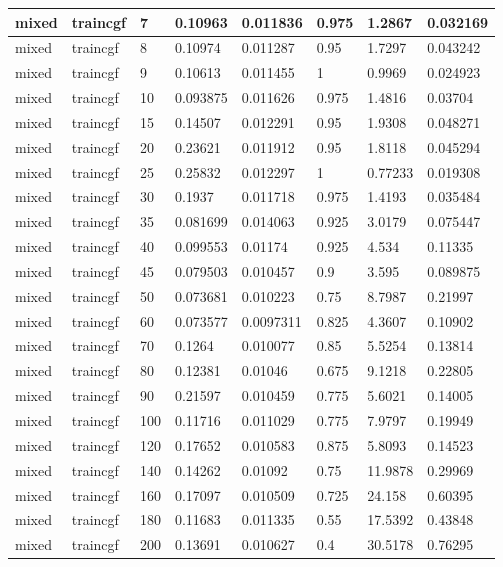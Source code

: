 \begin{longtable}{llllllll}
mixed & traincgf & 7 & 0.10963 & 0.011836 & 0.975 & 1.2867 & 0.032169 \\ \hline 
mixed & traincgf & 8 & 0.10974 & 0.011287 & 0.95 & 1.7297 & 0.043242 \\ \hline 
mixed & traincgf & 9 & 0.10613 & 0.011455 & 1 & 0.9969 & 0.024923 \\ \hline 
mixed & traincgf & 10 & 0.093875 & 0.011626 & 0.975 & 1.4816 & 0.03704 \\ \hline 
mixed & traincgf & 15 & 0.14507 & 0.012291 & 0.95 & 1.9308 & 0.048271 \\ \hline 
mixed & traincgf & 20 & 0.23621 & 0.011912 & 0.95 & 1.8118 & 0.045294 \\ \hline 
mixed & traincgf & 25 & 0.25832 & 0.012297 & 1 & 0.77233 & 0.019308 \\ \hline 
mixed & traincgf & 30 & 0.1937 & 0.011718 & 0.975 & 1.4193 & 0.035484 \\ \hline 
mixed & traincgf & 35 & 0.081699 & 0.014063 & 0.925 & 3.0179 & 0.075447 \\ \hline 
mixed & traincgf & 40 & 0.099553 & 0.01174 & 0.925 & 4.534 & 0.11335 \\ \hline 
mixed & traincgf & 45 & 0.079503 & 0.010457 & 0.9 & 3.595 & 0.089875 \\ \hline 
mixed & traincgf & 50 & 0.073681 & 0.010223 & 0.75 & 8.7987 & 0.21997 \\ \hline 
mixed & traincgf & 60 & 0.073577 & 0.0097311 & 0.825 & 4.3607 & 0.10902 \\ \hline 
mixed & traincgf & 70 & 0.1264 & 0.010077 & 0.85 & 5.5254 & 0.13814 \\ \hline 
mixed & traincgf & 80 & 0.12381 & 0.01046 & 0.675 & 9.1218 & 0.22805 \\ \hline 
mixed & traincgf & 90 & 0.21597 & 0.010459 & 0.775 & 5.6021 & 0.14005 \\ \hline 
mixed & traincgf & 100 & 0.11716 & 0.011029 & 0.775 & 7.9797 & 0.19949 \\ \hline 
mixed & traincgf & 120 & 0.17652 & 0.010583 & 0.875 & 5.8093 & 0.14523 \\ \hline 
mixed & traincgf & 140 & 0.14262 & 0.01092 & 0.75 & 11.9878 & 0.29969 \\ \hline 
mixed & traincgf & 160 & 0.17097 & 0.010509 & 0.725 & 24.158 & 0.60395 \\ \hline 
mixed & traincgf & 180 & 0.11683 & 0.011335 & 0.55 & 17.5392 & 0.43848 \\ \hline 
mixed & traincgf & 200 & 0.13691 & 0.010627 & 0.4 & 30.5178 & 0.76295 \\ \hline 

\end{longtable}
